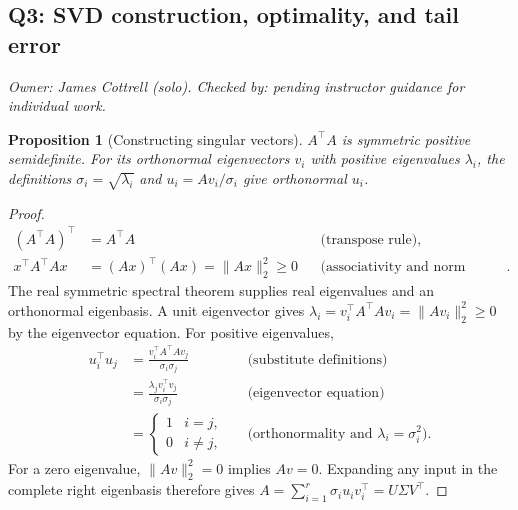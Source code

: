 \documentclass[11pt]{article}
\newtheorem{proposition}{Proposition}
\newcommand{\ownership}{\smallskip\textit{Owner: James Cottrell (solo).
Checked by: pending instructor guidance for individual work.}\par\smallskip}
\begin{document}
\subsection{Q3: SVD construction, optimality, and tail error}
\ownership
\begin{proposition}[Constructing singular vectors]
$A^\top A$ is symmetric positive semidefinite. For its orthonormal eigenvectors
$v_i$ with positive eigenvalues $\lambda_i$, the definitions
$\sigma_i=\sqrt{\lambda_i}$ and $u_i=Av_i/\sigma_i$ give orthonormal $u_i$.
\end{proposition}
\begin{proof}
\begin{align*}
(A^\top A)^\top&=A^\top A &&\text{(transpose rule)},\\
x^\top A^\top Ax&=(Ax)^\top(Ax)=\|Ax\|_2^2\ge0
&&\text{(associativity and norm definition)}.
\end{align*}
The real symmetric spectral theorem supplies real eigenvalues and an orthonormal
eigenbasis. A unit eigenvector gives
$\lambda_i=v_i^\top A^\top Av_i=\|Av_i\|_2^2\ge0$ by the eigenvector equation.
For positive eigenvalues,
\begin{align*}
u_i^\top u_j
&=\frac{v_i^\top A^\top Av_j}{\sigma_i\sigma_j}
&&\text{(substitute definitions)}\\
&=\frac{\lambda_jv_i^\top v_j}{\sigma_i\sigma_j}
&&\text{(eigenvector equation)}\\
&=\begin{cases}1&i=j,\\0&i\ne j,\end{cases}
&&\text{(orthonormality and $\lambda_i=\sigma_i^2$)}.
\end{align*}
For a zero eigenvalue, $\|Av\|_2^2=0$ implies $Av=0$. Expanding any input
in the complete right eigenbasis therefore gives
$A=\sum_{i=1}^r\sigma_i u_iv_i^\top=U\Sigma V^\top$.
\end{proof}
\end{document}

